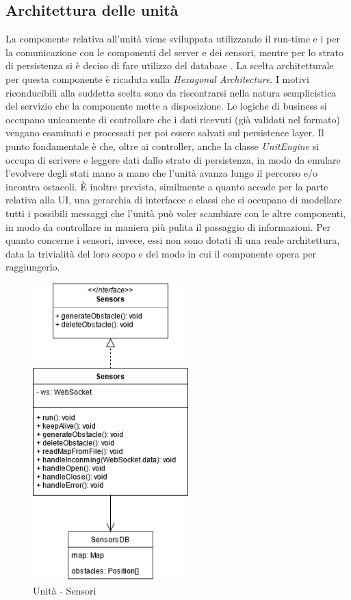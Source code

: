 \subsection{Architettura delle unità}
	La componente relativa all'unità viene sviluppata utilizzando il run-time  e i  per la comunicazione con le componenti del server e dei sensori, mentre per lo strato di persistenza si è deciso di fare utilizzo del database .
	La scelta architetturale per questa componente è ricaduta sulla \textit{Hexagonal Architecture}.
	I motivi riconducibili alla suddetta scelta sono da riscontrarsi nella natura semplicistica del servizio che la componente mette a disposizione. Le logiche di business si occupano unicamente di controllare che i dati ricevuti (già validati nel formato) vengano esaminati e processati per poi essere salvati sul persistence layer.
	Il punto fondamentale è che, oltre ai controller, anche la classe \textit{UnitEngine} si occupa di scrivere e leggere dati dallo strato di persistenza, in modo da emulare l'evolvere degli stati mano a mano che l'unità avanza lungo il percorso e/o incontra ostacoli.
	È inoltre prevista, similmente a quanto accade per la parte relativa alla UI, una gerarchia di interfacce e classi che si occupano di modellare tutti i possibili messaggi che l'unità può voler scambiare con le altre componenti, in modo da controllare in maniera più pulita il passaggio di informazioni.
	Per quanto concerne i sensori, invece, essi non sono dotati di una reale architettura, data la trivialità del loro scopo e del modo in cui il componente opera per raggiungerlo.
	
	\begin{figure}[H]
		\centering
		\includegraphics[width=6cm]{img/unit_sensori.png}
		\caption{Unità - Sensori}
	\end{figure}
	
